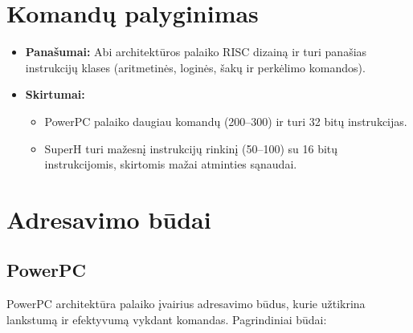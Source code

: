 \documentclass{article}
\begin{document}
\section*{Komandų palyginimas}
\begin{itemize}
    \item \textbf{Panašumai:} Abi architektūros palaiko RISC dizainą ir turi panašias instrukcijų klases (aritmetinės, loginės, šakų ir perkėlimo komandos).
    \item \textbf{Skirtumai:}
        \begin{itemize}
            \item PowerPC palaiko daugiau komandų (200–300) ir turi 32 bitų instrukcijas.
            \item SuperH turi mažesnį instrukcijų rinkinį (50–100) su 16 bitų instrukcijomis, skirtomis mažai atminties sąnaudai.
        \end{itemize}
\end{itemize}

\section{Adresavimo būdai}
\subsection{PowerPC}
PowerPC architektūra palaiko įvairius adresavimo būdus, kurie užtikrina lankstumą ir efektyvumą vykdant komandas. Pagrindiniai būdai:
\end{document}
